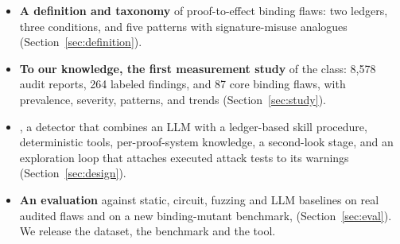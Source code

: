 \begin{itemize}
\item \textbf{A definition and taxonomy} of proof-to-effect binding flaws:
two ledgers, three conditions, and five patterns with signature-misuse
analogues (Section~\ref{sec:definition}).
\item \textbf{To our knowledge, the first measurement study} of the class: 8,578 audit reports,
264 labeled findings, and 87 core binding flaws, with prevalence, severity,
patterns, and trends (Section~\ref{sec:study}).
\item \textbf{\tool{}}, a detector that combines an LLM with a ledger-based
skill procedure, deterministic tools, per-proof-system knowledge, a
second-look stage, and an exploration loop that attaches executed attack tests
to its warnings (Section~\ref{sec:design}).
\item \textbf{An evaluation} against static, circuit, fuzzing and LLM
baselines on real audited flaws and on a new binding-mutant benchmark,
 (Section~\ref{sec:eval}).
We release the dataset, the benchmark and the tool.
\end{itemize}
